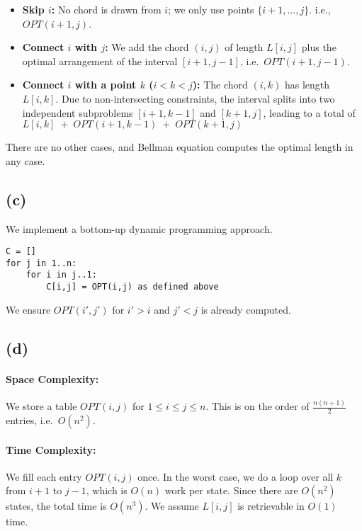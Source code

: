 \begin{itemize}
    \item \textbf{Skip $i$:}  
    No chord is drawn from $i$; we only use points $\{i+1, \dots, j\}$.  
    i.e., $OPT(i+1, j)$.

    \item \textbf{Connect $i$ with $j$:}  
    We add the chord $(i,j)$ of length $L[i,j]$ plus the optimal arrangement of the interval $[i+1, j-1]$, i.e.\ $OPT(i+1, j-1)$.

    \item \textbf{Connect $i$ with a point $k$ ($i < k < j$):}  
    The chord $(i,k)$ has length $L[i,k]$. Due to non-intersecting constraints, the interval splits into two independent subproblems $[i+1, k-1]$ and $[k+1, j]$, leading to a total of $L[i,k] \;+\; OPT(i+1, k-1) \;+\; OPT(k+1, j)$
\end{itemize}

There are no other cases, and Bellman equation computes the optimal length in any case.


\subsection*{(c)}

We implement a bottom-up dynamic programming approach.
\begin{verbatim}
C = []
for j in 1..n:
    for i in j..1:
        C[i,j] = OPT(i,j) as defined above
\end{verbatim}
We ensure $OPT(i', j')$ for $i' > i$ and $j' < j$ is already computed.

\subsection*{(d)}

\paragraph{Space Complexity:}
We store a table $OPT(i,j)$ for $1 \le i \le j \le n$. This is on the order of $\frac{n(n+1)}{2}$ entries, i.e.\ $O(n^2)$.

\paragraph{Time Complexity:}
We fill each entry $OPT(i,j)$ once. In the worst case, we do a loop over all $k$ from $i+1$ to $j-1$, which is $O(n)$ work per state. Since there are $O(n^2)$ states, the total time is $O(n^3)$. We assume $L[i,j]$ is retrievable in $O(1)$ time.

